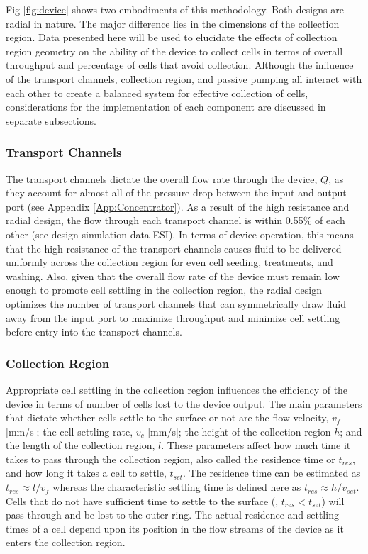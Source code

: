 Fig \ref{fig:device} shows two embodiments of this methodology. Both designs are radial in nature. The major difference lies in the dimensions of the collection region. Data presented here will be used to elucidate the effects of collection region geometry on the ability of the device to collect cells in terms of overall throughput and percentage of cells that avoid collection. Although the influence of the transport channels, collection region, and passive pumping all interact with each other to create a balanced system for effective collection of cells, considerations for the implementation of each component are discussed in separate subsections.

\subsubsection{Transport Channels} \label{sec:transport}

The transport channels dictate the overall flow rate through the device, $Q$, as they account for almost all of the pressure drop between the input and output port (see Appendix \ref{App:Concentrator}). As a result of the high resistance and radial design, the flow through each transport channel is within 0.55\% of each other (see design simulation data ESI). In terms of device operation, this means that the high resistance of the transport channels causes fluid to be delivered uniformly across the collection region for even cell seeding, treatments, and washing. Also, given that the overall flow rate of the device must remain low enough to promote cell settling in the collection region, the radial design optimizes the number of transport channels that can symmetrically draw fluid away from the input port to maximize throughput and minimize cell settling before entry into the transport channels.

\subsubsection{Collection Region}

Appropriate cell settling in the collection region influences the efficiency of the device in terms of number of cells lost to the device output. The main parameters that dictate whether cells settle to the surface or not are the flow velocity, $v_{f}$ [mm/s]; the cell settling rate, $v_{c}$ [mm/s]; the height of the collection region $h$; and the length of the collection region, $l$. These parameters affect how much time it takes to pass through the collection region, also called the residence time or $t_{res}$, and how long it takes a cell to settle, $t_{set}$. The residence time can be estimated as $t_{res} \approx l/v_{f}$ whereas the characteristic settling time is defined here as $t_{res}\approx h/v_{set}$. Cells that do not have sufficient time to settle to the surface (\ie , $t_{res} < t_{set}$) will pass through and be lost to the outer ring. The actual residence and settling times of a cell depend upon its position in the flow streams of the device as it enters the collection region.

